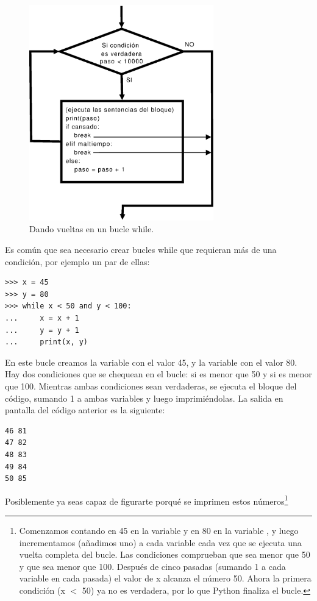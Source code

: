 \begin{figure}
\begin{center}
\includegraphics[width=80mm]{while.eps}
\end{center}
\caption{Dando vueltas en un bucle while.}\label{while}
\end{figure}

Es común que sea necesario crear bucles while que requieran más de una condición, por ejemplo un par de ellas:

\begin{listing}
\begin{verbatim}
>>> x = 45
>>> y = 80
>>> while x < 50 and y < 100:
...     x = x + 1
...     y = y + 1
...     print(x, y)
\end{verbatim}
\end{listing}

En este bucle creamos la variable  con el valor 45, y la variable  con el valor 80.  Hay dos condiciones que se chequean en el bucle: si  es menor que 50 y si  es menor que 100. Mientras ambas condiciones sean verdaderas, se ejecuta el bloque del código, sumando 1 a ambas variables y luego imprimiéndolas.  La salida en pantalla del código anterior es la siguiente:

\begin{listing}
\begin{verbatim}
46 81
47 82
48 83
49 84
50 85
\end{verbatim}
\end{listing}

Posiblemente ya seas capaz de figurarte porqué se imprimen estos números\footnote{Comenzamos contando en 45 en la variable  y en 80 en la variable , y luego incrementamos (añadimos uno) a cada variable cada vez que se ejecuta una vuelta completa del bucle.  Las condiciones comprueban que  sea menor que 50 y que  sea menor que 100.  Después de cinco pasadas (sumando 1 a cada variable en cada pasada) el valor de x alcanza el número 50.  Ahora la primera condición (x $<$ 50) ya no es verdadera, por lo que Python finaliza el bucle.}

